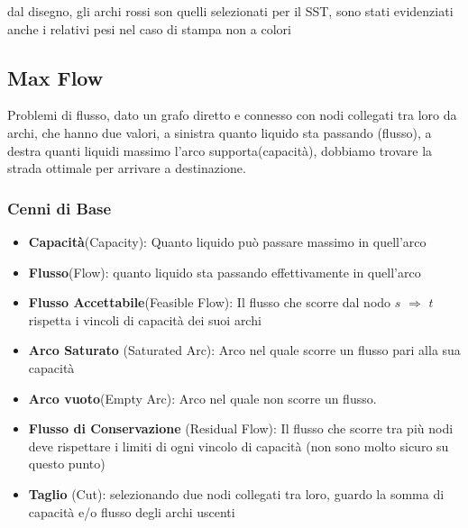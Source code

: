 \documentclass{article}
\begin{document}
dal disegno, gli archi rossi son quelli selezionati per il SST, sono stati evidenziati anche i relativi pesi nel caso di stampa non a colori

\subsection{Max Flow}
Problemi di flusso, dato un grafo diretto e connesso con nodi collegati tra loro da archi, che hanno due valori, a sinistra quanto liquido sta passando (flusso), a destra quanti liquidi massimo l'arco supporta(capacità), dobbiamo trovare la strada ottimale per arrivare a destinazione.

\subsubsection{Cenni di Base}
\begin{itemize}
\item \textbf{Capacità}(Capacity): Quanto liquido può passare massimo in quell'arco
\item \textbf{Flusso}(Flow): quanto liquido sta passando effettivamente in quell'arco
\item \textbf{Flusso Accettabile}(Feasible Flow): Il flusso che scorre dal nodo $s$ $\Rightarrow$ $t$ rispetta i vincoli di capacità dei suoi archi

\item\textbf{Arco Saturato} (Saturated Arc): Arco nel quale scorre un flusso pari alla sua capacità
\item\textbf{Arco vuoto}(Empty Arc): Arco nel quale non scorre un flusso.
\item \textbf{Flusso di Conservazione} (Residual Flow): Il flusso che scorre tra più nodi deve rispettare i limiti di ogni vincolo di capacità (non sono molto sicuro su questo punto)
\item	\textbf{Taglio} (Cut): selezionando due nodi collegati tra loro, guardo la somma di capacità e/o flusso degli archi uscenti
\end{itemize}
\end{document}
